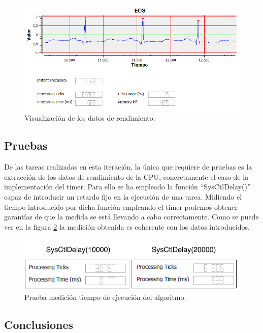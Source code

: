         \begin{figure}[H]
                \centering
                        \includegraphics[width = 0.9 \linewidth]{figuras/Performance.PNG}
                \caption{Visualización de los datos de rendimiento.}
                \label{fig:performance}
        \end{figure}
        
    \subsection{Pruebas}
        
        De las tareas realizadas en esta iteración, la única que requiere de pruebas es la extracción de los datos de rendimiento de la CPU, concretamente el caso de la implementación del timer. Para ello se ha empleado la función ``SysCtlDelay()'' capaz de introducir un retardo fijo en la ejecución de una tarea. Midiendo el tiempo introducido por dicha función empleando el timer podemos obtener garantías de que la medida se está llevando a cabo correctamente. Como se puede ver en la figura \ref{fig:performanceTest} la medición obtenida es coherente con los datos introducidos.
        
        \begin{figure}[H]
                \centering
                        \includegraphics[width = 0.9 \linewidth]{figuras/PerformanceTest.pdf}
                \caption{Prueba medición tiempo de ejecución del algoritmo.}
                \label{fig:performanceTest}
        \end{figure}

    \subsection{Conclusiones}
    
